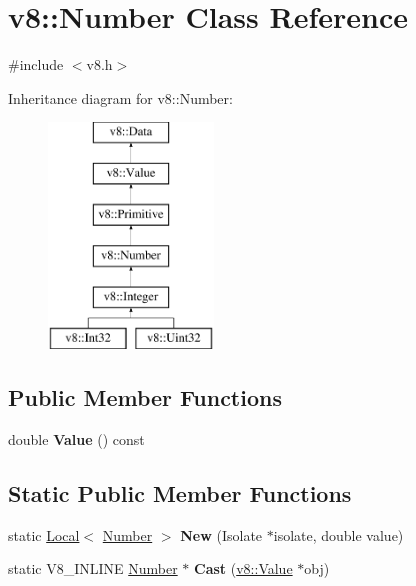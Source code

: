 \hypertarget{classv8_1_1Number}{}\section{v8\+:\+:Number Class Reference}
\label{classv8_1_1Number}


{\ttfamily \#include $<$v8.\+h$>$}

Inheritance diagram for v8\+:\+:Number\+:\begin{figure}[H]
\begin{center}
\leavevmode
\includegraphics[height=6.000000cm]{classv8_1_1Number}
\end{center}
\end{figure}
\subsection*{Public Member Functions}
\begin{DoxyCompactItemize}
\item 
\mbox{\label{classv8_1_1Number_aed515db835eefc10820d45c60775e950}} 
double {\bfseries Value} () const
\end{DoxyCompactItemize}
\subsection*{Static Public Member Functions}
\begin{DoxyCompactItemize}
\item 
\mbox{\label{classv8_1_1Number_a4d8822be251214dab4cf0212475ede76}} 
static \mbox{\hyperlink{classv8_1_1Local}{Local}}$<$ \mbox{\hyperlink{classv8_1_1Number}{Number}} $>$ {\bfseries New} (Isolate $\ast$isolate, double value)
\item 
\mbox{\label{classv8_1_1Number_a053d48e0003104308963a4a7e3881912}} 
static V8\+\_\+\+I\+N\+L\+I\+NE \mbox{\hyperlink{classv8_1_1Number}{Number}} $\ast$ {\bfseries Cast} (\mbox{\hyperlink{classv8_1_1Value}{v8\+::\+Value}} $\ast$obj)
\end{DoxyCompactItemize}



